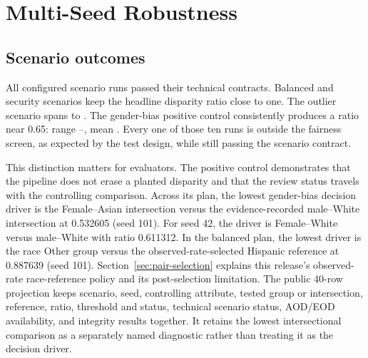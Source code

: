\section{Multi-Seed Robustness}

\subsection{Scenario outcomes}

\begin{table}[H]
\centering
\footnotesize

\caption{Technical outcome, fairness disposition, headline gender Female/Male ratio, and the
lowest decision-driving comparison over ten fixed seeds. Each driver is read from the run's
\texttt{compliance\_decision.basis.worst\_case}; the tested group or intersection, reference,
ratio, threshold status, and seed stay together. A technical pass and a fairness review warning are
separate fields.}
\label{tab:robustness}
\end{table}

All \RobustnessPasses{} configured scenario runs passed their technical contracts. Balanced and
security scenarios keep the headline disparity ratio close to one. The outlier scenario spans
\OutliersRatioMin{} to \OutliersRatioMax{}. The gender-bias positive control consistently produces a
ratio near 0.65: range \GenderBiasRatioMin{}--\GenderBiasRatioMax{}, mean
\GenderBiasRatioMean{}. Every one of those ten runs is outside the fairness screen, as expected by
the test design, while still passing the scenario contract.

This distinction matters for evaluators. The positive control demonstrates that the pipeline does
not erase a planted disparity and that the review status travels with the controlling comparison.
Across its plan, the lowest gender-bias decision driver is the Female--Asian intersection versus
the evidence-recorded male--White intersection at 0.532605 (seed 101). For seed 42, the driver is
Female--White versus male--White with ratio 0.611312. In the balanced plan, the lowest driver is the
race Other group versus the observed-rate-selected Hispanic reference at 0.887639 (seed 101).
Section~\ref{sec:pair-selection} explains this release's observed-rate race-reference policy and its
post-selection limitation. The public 40-row projection keeps scenario, seed, controlling
attribute, tested group or intersection, reference, ratio, threshold and status, technical scenario
status, AOD/EOD availability, and integrity results together. It retains the lowest intersectional
comparison as a separately named diagnostic rather than treating it as the decision driver.

